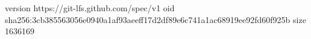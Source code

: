 version https://git-lfs.github.com/spec/v1
oid sha256:3cb385563056e0940a1af93aeeff17d2df89e6c741a1ac68919ee92fd60f925b
size 1636169
